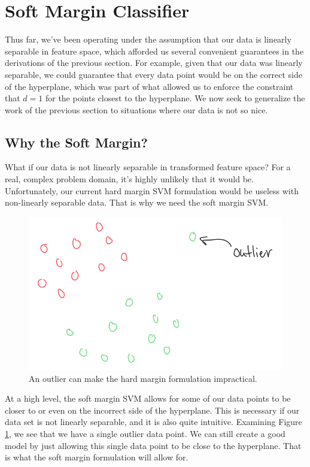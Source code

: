 \section{Soft Margin Classifier}
Thus far, we've been operating under the assumption that our data is linearly separable in feature space, which afforded us several convenient guarantees in the derivations of the previous section. For example, given that our data was linearly separable, we could guarantee that every data point would be on the correct side of the hyperplane, which was part of what allowed us to enforce the constraint that $d=1$ for the points closest to the hyperplane. We now seek to generalize the work of the previous section to situations where our data is not so nice.

\subsection{Why the Soft Margin?}
What if our data is not linearly separable in transformed feature space? For a real, complex problem domain, it's highly unlikely that it would be. Unfortunately, our current hard margin SVM formulation would be useless with non-linearly separable data. That is why we need the soft margin SVM.

\begin{figure}
    \centering
    \includegraphics[width=0.5\paperwidth]{../SupportVectorMachines/fig/outlier-data-pt.png}
    \caption{An outlier can make the hard margin formulation impractical.}
    \label{fig:outlier-data-pt}
\end{figure}

At a high level, the soft margin SVM allows for some of our data points to be closer to or even on the incorrect side of the hyperplane. This is necessary if our data set is not linearly separable, and it is also quite intuitive. Examining Figure \ref{fig:outlier-data-pt}, we see that we have a single outlier data point. We can still create a good model by just allowing this single data point to be close to the hyperplane. That is what the soft margin formulation will allow for.

